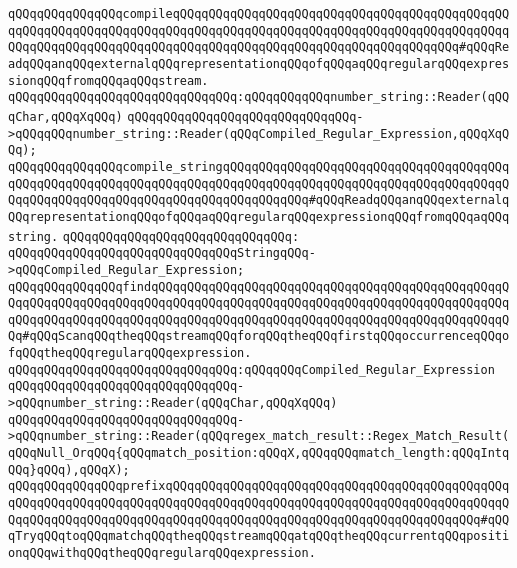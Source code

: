 \newline
\verb|qQQqqQQqqQQqqQQqcompileqQQqqQQqqQQqqQQqqQQqqQQqqQQqqQQqqQQqqQQqqQQqqQQqqQQqqQQqqQQqqQQqqQQqqQQqqQQqqQQqqQQqqQQqqQQqqQQqqQQqqQQqqQQqqQQqqQQqqQQqqQQqqQQqqQQqqQQqqQQqqQQqqQQqqQQqqQQqqQQqqQQqqQQqqQQqqQQqqQQq#qQQqReadqQQqanqQQqexternalqQQqrepresentationqQQqofqQQqaqQQqregularqQQqexpressionqQQqfromqQQqaqQQqstream.|\newline
\verb|qQQqqQQqqQQqqQQqqQQqqQQqqQQqqQQq:qQQqqQQqqQQqnumber_string::Reader(qQQqChar,qQQqXqQQq)|\newline
\verb|qQQqqQQqqQQqqQQqqQQqqQQqqQQqqQQq->qQQqqQQqnumber_string::Reader(qQQqCompiled_Regular_Expression,qQQqXqQQq);|\newline
\newline
\verb|qQQqqQQqqQQqqQQqcompile_stringqQQqqQQqqQQqqQQqqQQqqQQqqQQqqQQqqQQqqQQqqQQqqQQqqQQqqQQqqQQqqQQqqQQqqQQqqQQqqQQqqQQqqQQqqQQqqQQqqQQqqQQqqQQqqQQqqQQqqQQqqQQqqQQqqQQqqQQqqQQqqQQqqQQqqQQq#qQQqReadqQQqanqQQqexternalqQQqrepresentationqQQqofqQQqaqQQqregularqQQqexpressionqQQqfromqQQqaqQQqstring.|\newline
\verb|qQQqqQQqqQQqqQQqqQQqqQQqqQQqqQQq:|\newline
\verb|qQQqqQQqqQQqqQQqqQQqqQQqqQQqqQQqStringqQQq->qQQqCompiled_Regular_Expression;|\newline
\newline
\newline
\verb|qQQqqQQqqQQqqQQqfindqQQqqQQqqQQqqQQqqQQqqQQqqQQqqQQqqQQqqQQqqQQqqQQqqQQqqQQqqQQqqQQqqQQqqQQqqQQqqQQqqQQqqQQqqQQqqQQqqQQqqQQqqQQqqQQqqQQqqQQqqQQqqQQqqQQqqQQqqQQqqQQqqQQqqQQqqQQqqQQqqQQqqQQqqQQqqQQqqQQqqQQqqQQqqQQq#qQQqScanqQQqtheqQQqstreamqQQqforqQQqtheqQQqfirstqQQqoccurrenceqQQqofqQQqtheqQQqregularqQQqexpression.|\newline
\verb|qQQqqQQqqQQqqQQqqQQqqQQqqQQqqQQq:qQQqqQQqCompiled_Regular_Expression|\newline
\verb|qQQqqQQqqQQqqQQqqQQqqQQqqQQqqQQq->qQQqnumber_string::Reader(qQQqChar,qQQqXqQQq)|\newline
\verb|qQQqqQQqqQQqqQQqqQQqqQQqqQQqqQQq->qQQqnumber_string::Reader(qQQqregex_match_result::Regex_Match_Result(qQQqNull_OrqQQq{qQQqmatch_position:qQQqX,qQQqqQQqmatch_length:qQQqIntqQQq}qQQq),qQQqX);|\newline
\newline
\newline
\verb|qQQqqQQqqQQqqQQqprefixqQQqqQQqqQQqqQQqqQQqqQQqqQQqqQQqqQQqqQQqqQQqqQQqqQQqqQQqqQQqqQQqqQQqqQQqqQQqqQQqqQQqqQQqqQQqqQQqqQQqqQQqqQQqqQQqqQQqqQQqqQQqqQQqqQQqqQQqqQQqqQQqqQQqqQQqqQQqqQQqqQQqqQQqqQQqqQQqqQQqqQQq#qQQqTryqQQqtoqQQqmatchqQQqtheqQQqstreamqQQqatqQQqtheqQQqcurrentqQQqpositionqQQqwithqQQqtheqQQqregularqQQqexpression.|\newline
